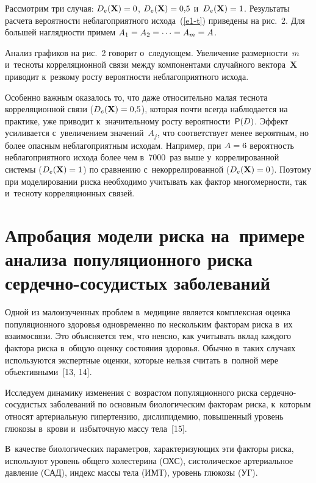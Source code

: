 \begin{multicols}{2}
  Рассмотрим три случая: $D_e(\mathbf{X}) \hm= 0$, $D_e(\mathbf{X}) \hm= 
0{,}5$ и~$D_e(\mathbf{X}) \hm= 1$. Результаты рас\-че\-та ве\-ро\-ят\-ности 
неблагоприятного исхода~(\ref{e1-t}) приведены на рис.~2. Для большей на\-гляд\-ности 
примем  $A_1\hm=A_2= \cdots =A_m\hm=A$.
  
 
  
  Анализ графиков на рис.~2 говорит о~сле\-ду\-ющем. Увеличение 
раз\-мер\-ности~$m$ и~тес\-но\-ты кор\-ре\-ля\-ционной связи меж\-ду компонентами 
случайного вектора~$\mathbf{X}$ приводит к~резкому рос\-ту ве\-ро\-ят\-ности 
не\-бла\-го\-при\-ят\-но\-го исхода.
  
  Особенно важным оказалось то, что даже относительно малая тес\-но\-та 
корреляционной связи ($D_e(\mathbf{X}) \hm= 0{,}5$), которая почти всегда 
наблюдается на прак\-ти\-ке, уже приводит к~значительному рос\-ту 
ве\-ро\-ят\-ности~${\sf P}(D)$. Эффект усиливается с~увеличением значений~$A_j$, что 
соответствует менее вероятным, но более опас\-ным неблагоприятным исходам. 
Например, при $A\hm = 6$ ве\-ро\-ят\-ность неблагоприятного исхода более чем 
в~7000~раз выше у~коррелированной сис\-те\-мы ($D_e(\mathbf{X}) \hm= 1$) по 
срав\-не\-нию с~некоррелированной ($D_e(\mathbf{X}) \hm= 0$). Поэтому при 
моделировании рис\-ка необходимо учитывать как фактор мно\-го\-мер\-ности, так 
и~тес\-но\-ту корреляционных связей.

  

\section{Апробация модели риска на~примере анализа 
популяционного риска сердечно-сосудистых заболеваний}

  Одной из малоизученных проблем в~медицине является комплексная оценка 
популяционного здоровья одновременно по нескольким факторам риска в~их 
взаимосвязи. Это объясняется тем, что не\-яс\-но, как учитывать вклад каждого 
фак\-то\-ра рис\-ка в~общую оценку со\-сто\-яния здоровья. Обычно в~таких случаях 
используются экспертные оценки, которые нельзя считать в~полной мере 
объективными~[13, 14].
  
  Исследуем динамику изменения с~возрастом популяционного риска 
сер\-деч\-но-со\-су\-ди\-стых за\-бо\-леваний по основным биологическим факторам риска, 
к~которым относят артериальную ги\-пер\-тен\-зию, дис\-ли\-пи\-де\-мию, повышенный 
уро\-вень глюкозы в~крови и~избыточную массу тела~[15]. 

В~качестве 
биологических па\-ра\-мет\-ров, ха\-рак\-те\-ри\-зу\-ющих эти факторы рис\-ка, используют 
уровень общего холестерина (ОХС), сис\-то\-ли\-че\-ское артериальное дав\-ле\-ние 
(САД), индекс массы тела (ИМТ), уровень глюкозы (УГ). 


\end{multicols}
